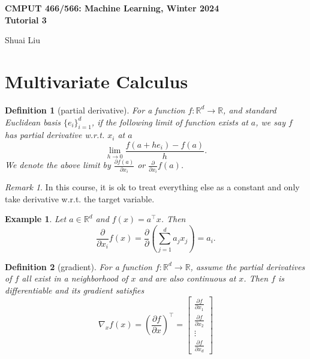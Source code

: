 \documentclass{article}
\newtheorem{definition}{Definition}
\newtheorem{example}{Example}
\newcommand{\R}{\mathbb{R}}
\DeclareMathOperator*{\1}{\mathbbm{1}}
\theoremstyle{definition}
\theoremstyle{remark}
\newtheorem{remark}{Remark}
\begin{document}
\begin{center}
  {\Large \textbf{CMPUT 466/566: Machine Learning, Winter 2024\\ Tutorial 3}}
  \end{center}
  \begin{center}
    Shuai Liu
  \end{center}
  \section{Multivariate Calculus}
  \begin{definition}[partial derivative]
    For a function $f:\R^d\to \R$, and standard Euclidean basis $\{e_i\}_{i=1}^d$, if the following limit of function exists at $a$, we say $f$ has partial derivative w.r.t. $x_i$ at $a$
    \begin{equation*}
        \lim_{h\to 0}\frac{f(a+he_i)-f(a)}{h}.
    \end{equation*}
    We denote the above limit by $\frac{\partial f(a)}{\partial x_i}$ or $\frac{\partial}{\partial x_i}f(a)$.
  \end{definition}
  \begin{remark}
    In this course, it is ok to treat everything else as a constant and only take derivative w.r.t. the target variable.
  \end{remark}
  \begin{example}
    Let $a\in \R^d$ and $f(x)=a^\top x$. Then \[\frac{\partial}{\partial x_i}f(x)=\frac{\partial}{\partial}(\sum_{j=1}^d a_jx_j)=a_i.\]
  \end{example}
  \begin{definition}[gradient]
    For a function $f:\R^d\to\R$, assume the partial derivatives of $f$ all exist in a neighborhood of $x$ and are also continuous at $x$. Then $f$ is differentiable and its gradient satisfies
    \begin{equation*}
        \nabla_x f(x)=\left(\frac{\partial f}{\partial x}\right)^\top =\begin{bmatrix}
            \frac{\partial f}{\partial x_1}\\
            \frac{\partial f}{\partial x_2}\\
            \vdots\\
            \frac{\partial f}{\partial x_d}
        \end{bmatrix}
    \end{equation*}
  \end{definition}
\end{document}
